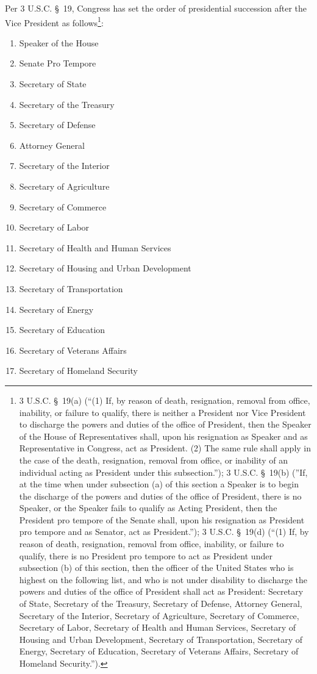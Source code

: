 Per 3 U.S.C. \S\ 19, Congress has set the order of presidential succession after the Vice President as follows\footnote{3 U.S.C. \S\ 19(a) (``(1) If, by reason of death, resignation, removal from office, inability, or failure to qualify, there is neither a President nor Vice President to discharge the powers and duties of the office of President, then the Speaker of the House of Representatives shall, upon his resignation as Speaker and as Representative in Congress, act as President.  (2) The same rule shall apply in the case of the death, resignation, removal from office, or inability of an individual acting as President under this subsection.''); 3 U.S.C. \S\ 19(b) (''If, at the time when under subsection (a) of this section a Speaker is to begin the discharge of the powers and duties of the office of President, there is no Speaker, or the Speaker fails to qualify as Acting President, then the President pro tempore of the Senate shall, upon his resignation as President pro tempore and as Senator, act as President.''); 3 U.S.C. \S\ 19(d) (``(1) If, by reason of death, resignation, removal from office, inability, or failure to qualify, there is no President pro tempore to act as President under subsection (b) of this section, then the officer of the United States who is highest on the following list, and who is not under disability to discharge the powers and duties of the office of President shall act as President: Secretary of State, Secretary of the Treasury, Secretary of Defense, Attorney General, Secretary of the Interior, Secretary of Agriculture, Secretary of Commerce, Secretary of Labor, Secretary of Health and Human Services, Secretary of Housing and Urban Development, Secretary of Transportation, Secretary of Energy, Secretary of Education, Secretary of Veterans Affairs, Secretary of Homeland Security.'').}:
\begin{enumerate}
\item Speaker of the House
\item Senate Pro Tempore
\item Secretary of State
\item Secretary of the Treasury
\item Secretary of Defense
\item Attorney General
\item Secretary of the Interior
\item Secretary of Agriculture
\item Secretary of Commerce
\item Secretary of Labor
\item Secretary of Health and Human Services
\item Secretary of Housing and Urban Development
\item Secretary of Transportation
\item Secretary of Energy
\item Secretary of Education
\item Secretary of Veterans Affairs
\item Secretary of Homeland Security
\end{enumerate}

